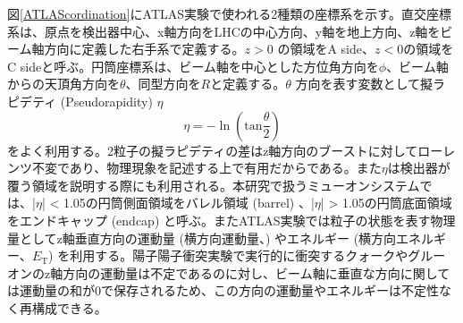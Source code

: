     図\ref{ATLAScordination}にATLAS実験で使われる2種類の座標系を示す。直交座標系は、原点を検出器中心、x軸方向をLHCの中心方向、y軸を地上方向、z軸をビーム軸方向に定義した右手系で定義する。$z>0$ の領域をA side、$z<0$の領域をC sideと呼ぶ。円筒座標系は、ビーム軸を中心とした方位角方向を$\phi$、ビーム軸からの天頂角方向を$\theta$、同型方向を$R$と定義する。$\theta$ 方向を表す変数として擬ラピデティ  (Pseudorapidity) $\eta$
    \begin{equation}
        \eta = -\ln(\mathrm{tan}\frac{\theta}{2})
    \end{equation}
    をよく利用する。2粒子の擬ラピデティの差はz軸方向のブーストに対してローレンツ不変であり、物理現象を記述する上で有用だからである。また$\eta$は検出器が覆う領域を説明する際にも利用される。本研究で扱うミューオンシステムでは、|$\eta$| < 1.05の円筒側面領域をバレル領域 (barrel) 、|$\eta$| > 1.05の円筒底面領域をエンドキャップ (endcap) と呼ぶ。またATLAS実験では粒子の状態を表す物理量としてz軸垂直方向の運動量 (横方向運動量、\pt) やエネルギー (横方向エネルギー、$E_{\mathrm{T}}$) を利用する。陽子陽子衝突実験で実行的に衝突するクォークやグルーオンのz軸方向の運動量は不定であるのに対し、ビーム軸に垂直な方向に関しては運動量の和が0で保存されるため、この方向の運動量やエネルギーは不定性なく再構成できる。
